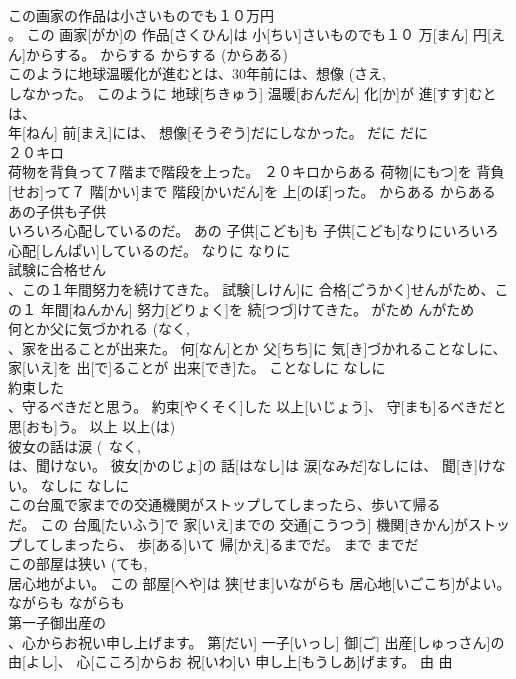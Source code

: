 \documentclass[8pt]{extreport}
\begin{document}
\begin{CJK}{UTF8}{min}
\\	この画家の作品は小さいものでも１０万円 
\\	。	この 画家[がか]の 作品[さくひん]は 小[ちい]さいものでも１０ 万[まん] 円[えん]からする。	からする	からする (からある)	
\\	このように地球温暖化が進むとは、30年前には、想像 (さえ, 
\\	しなかった。	このように 地球[ちきゅう] 温暖[おんだん] 化[か]が 進[すす]むとは、 
\\	年[ねん] 前[まえ]には、 想像[そうぞう]だにしなかった。	だに	だに	
\\	２０キロ 
\\	荷物を背負って７階まで階段を上った。	２０キロからある 荷物[にもつ]を 背負[せお]って７ 階[かい]まで 階段[かいだん]を 上[のぼ]った。	からある	からある	
\\	あの子供も子供 
\\	いろいろ心配しているのだ。	あの 子供[こども]も 子供[こども]なりにいろいろ 心配[しんぱい]しているのだ。	なりに	なりに	
\\	試験に合格せん 
\\	、この１年間努力を続けてきた。	試験[しけん]に 合格[ごうかく]せんがため、この１ 年間[ねんかん] 努力[どりょく]を 続[つづ]けてきた。	がため	んがため	
\\	何とか父に気づかれる (なく, 
\\	、家を出ることが出来た。	何[なん]とか 父[ちち]に 気[き]づかれることなしに、 家[いえ]を 出[で]ることが 出来[でき]た。	ことなしに	なしに	
\\	約束した 
\\	、守るべきだと思う。	約束[やくそく]した 以上[いじょう]、 守[まも]るべきだと 思[おも]う。	以上	以上(は)	
\\	彼女の話は涙 (~なく, 
\\	は、聞けない。	彼女[かのじょ]の 話[はなし]は 涙[なみだ]なしには、 聞[き]けない。	なしに	なしに	
\\	この台風で家までの交通機関がストップしてしまったら、歩いて帰る 
\\	だ。	この 台風[たいふう]で 家[いえ]までの 交通[こうつう] 機関[きかん]がストップしてしまったら、 歩[ある]いて 帰[かえ]るまでだ。	まで	までだ	
\\	この部屋は狭い (ても, 
\\	居心地がよい。	この 部屋[へや]は 狭[せま]いながらも 居心地[いごこち]がよい。	ながらも	ながらも	
\\	第一子御出産の 
\\	、心からお祝い申し上げます。	第[だい] 一子[いっし] 御[ご] 出産[しゅっさん]の 由[よし]、 心[こころ]からお 祝[いわ]い 申し上[もうしあ]げます。	由	由	

\end{CJK}
\end{document}
